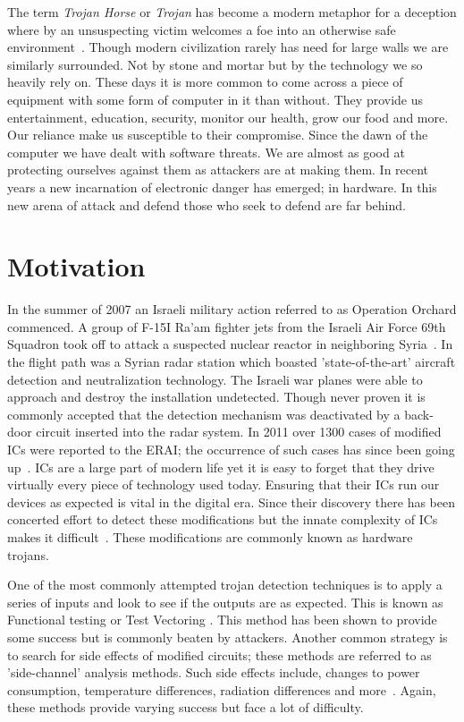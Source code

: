\label{chapter:introduction}
The term \textit{Trojan Horse} or \textit{Trojan} has become a modern metaphor for a deception where by an unsuspecting victim welcomes a foe into an otherwise safe environment~\cite{searchForTrojanWar}.
Though modern civilization rarely has need for large walls we are similarly surrounded.
Not by stone and mortar but by the technology we so heavily rely on.
These days it is more common to come across a piece of equipment with some form of computer in it than without.
They provide us entertainment, education, security, monitor our health, grow our food and more.
Our reliance make us susceptible to their compromise.
Since the dawn of the computer we have dealt with software threats.
We are almost as good at protecting ourselves against them as attackers are at making them.
In recent years a new incarnation of electronic danger has emerged; in hardware.
In this new arena of attack and defend those who seek to defend are far behind.

\section{Motivation}
In the summer of 2007 an Israeli military action referred to as Operation Orchard commenced.
A group of F-15I Ra'am fighter jets from the Israeli Air Force 69th Squadron took off to attack a suspected nuclear reactor in neighboring Syria~\cite{stoppingHTsIEEESpectrum}.
In the flight path was a Syrian radar station which boasted 'state-of-the-art' aircraft detection and neutralization technology. 
The Israeli war planes were able to approach and destroy the installation undetected.
Though never proven it is commonly accepted that the detection mechanism was deactivated by a back-door circuit inserted into the radar system.
In 2011 over 1300 cases of modified \acrshort{IC}s were reported to the \acrfull{ERAI}; the occurrence of such cases has since been going up~\cite{counterfeitIEEESpectrum}.
\acrfull{ICs} are a large part of modern life yet it is easy to forget that they drive virtually every piece of technology used today.
Ensuring that their \acrshort{IC}s run our devices as expected is vital in the digital era.
Since their discovery there has been concerted effort to detect these modifications but the innate complexity of \acrshort{IC}s makes it difficult~\cite{hardwareTrojanSurvey2015}.
These modifications are commonly known as hardware trojans.

One of the most commonly attempted trojan detection techniques is to apply a series of inputs and look to see if the outputs are as expected.
This is known as Functional testing or Test Vectoring \cite{kSubset,monteCarloTestPattern,towardsDetectionMethodology}.
This method has been shown to provide some success but is commonly beaten by attackers.
Another common strategy is to search for side effects of modified circuits; these methods are referred to as 'side-channel' analysis methods.
Such side effects include, changes to power consumption, temperature differences, radiation differences and more~\cite{sideChannelObfuscation, postLayout, controllableSleepTransistors, pcaAlgorithm}.
Again, these methods provide varying success but face a lot of difficulty.

